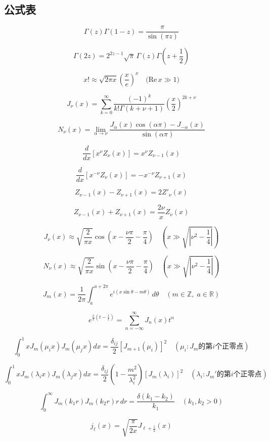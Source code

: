 \subsection{公式表}
\[
\Gamma(z)\Gamma(1 - z) = \frac{\pi}{\sin(\pi z)}
\]

\[
\Gamma(2z) = 2^{2z - 1} \sqrt{\pi} \, \Gamma(z) \Gamma\left(z + \frac{1}{2}\right)
\]

\[
x! \approx \sqrt{2\pi x} \left( \frac{x}{e} \right)^x \quad \text{(Re}\, x \gg 1)
\]

\[
J_\nu(x) = \sum_{k=0}^{\infty} \frac{(-1)^k}{k! \Gamma(k + \nu + 1)} \left( \frac{x}{2} \right)^{2k + \nu}
\]

\[
N_\nu(x) = \lim_{\alpha \to \nu} \frac{J_\alpha(x) \cos(\alpha\pi) - J_{-\alpha}(x)}{\sin(\alpha \pi)}
\]

\[
\frac{d}{dx} \left[ x^\nu Z_\nu(x) \right] = x^\nu Z_{\nu - 1}(x)
\]

\[
\frac{d}{dx} \left[ x^{-\nu} Z_\nu(x) \right] = -x^{-\nu} Z_{\nu + 1}(x)
\]

\[
Z_{\nu - 1}(x) - Z_{\nu + 1}(x) = 2 Z'_\nu(x)
\]

\[
Z_{\nu - 1}(x) + Z_{\nu + 1}(x) = \frac{2\nu}{x} Z_\nu(x)
\]

\[
J_\nu(x) \approx \sqrt{\frac{2}{\pi x}} \cos\left( x - \frac{\nu\pi}{2} - \frac{\pi}{4} \right)
\quad (x \gg \sqrt{|\nu^2 - \frac{1}{4}|})
\]

\[
N_\nu(x) \approx \sqrt{\frac{2}{\pi x}} \sin\left( x - \frac{\nu\pi}{2} - \frac{\pi}{4} \right)
\quad (x \gg \sqrt{|\nu^2 - \frac{1}{4}|})
\]

\[
J_m(x) = \frac{1}{2\pi} \int_a^{a+2\pi} e^{i(x \sin \theta - m \theta)}\, d\theta
\quad (m \in \mathbb{Z},\; a \in \mathbb{R})
\]

\[
e^{\frac{x}{2} \left(t - \frac{1}{t}\right)} = \sum_{n=-\infty}^{\infty} J_n(x) t^n
\]

\[
\int_0^1 x J_m(\mu_i x) J_m(\mu_j x) dx = 
\frac{\delta_{ij}}{2} [J_{m+1}(\mu_i)]^2
\quad (\mu_i: J_m \text{的第}i\text{个正零点})
\]

\[
\int_0^1 x J_m(\lambda_i x) J_m(\lambda_j x) dx = 
\frac{\delta_{ij}}{2} \left(1 - \frac{m^2}{\lambda_i^2}\right) [J_m(\lambda_i)]^2
\quad (\lambda_i: J_m' \text{的第}i\text{个正零点})
\]

\[
\int_0^\infty J_m(k_1 r) J_m(k_2 r) r\,dr = \frac{\delta(k_1 - k_2)}{k_1}
\quad (k_1, k_2 > 0)
\]

\[
j_\ell(x) = \sqrt{\frac{\pi}{2x}} J_{\ell + \frac{1}{2}}(x)
\]

